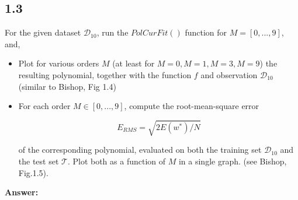 \documentclass[a4paper]{article}
\begin{document}
\subsection*{1.3}

For the given dataset $\mathcal{D}_{10}$, run the $PolCurFit()$ function for $M = [0,...,9]$, and,

\begin{itemize}
	\item Plot for various orders $M$ (at least for $M = 0, M = 1, M = 3, M = 9$) the resulting polynomial, together with the function $f$ and observation $\mathcal{D}_{10}$ (similar to Bishop, Fig 1.4)
	\item For each order $M \in [0,...,9]$, compute the root-mean-square error
	
	\begin{equation}
		E_{RMS} = \sqrt{2E(w^*)/N}
	\end{equation}
	
	of the corresponding polynomial, evaluated on both the training set $\mathcal{D}_{10}$ and the test set $\mathcal{T}$. Plot both as a function of $M$ in a single graph. (see Bishop, Fig.1.5).\\
\end{itemize}

\textbf{Answer:}\\
\end{document}
